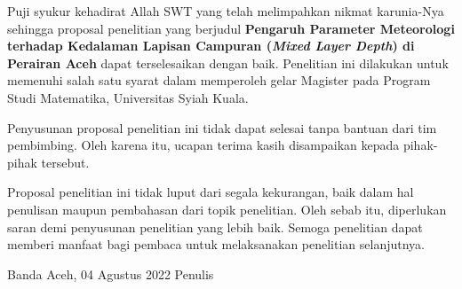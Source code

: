 \begin{spacing}{1.5}
	\pagestyle{empty}
	
	\vskip 1cm
	\par Puji syukur kehadirat Allah SWT yang telah melimpahkan nikmat karunia-Nya sehingga proposal penelitian yang berjudul \textbf{Pengaruh Parameter Meteorologi terhadap Kedalaman Lapisan Campuran (\textit{Mixed Layer Depth}) di Perairan Aceh} dapat terselesaikan dengan baik. Penelitian ini dilakukan untuk memenuhi salah satu syarat dalam memperoleh gelar Magister pada Program Studi Matematika, Universitas Syiah Kuala.
	\par Penyusunan proposal penelitian ini tidak dapat selesai tanpa bantuan dari tim pembimbing. Oleh karena itu, ucapan terima  kasih disampaikan kepada pihak-pihak tersebut.
	\par Proposal penelitian ini tidak luput dari segala kekurangan, baik dalam hal penulisan maupun pembahasan dari topik penelitian. Oleh sebab itu, diperlukan saran demi penyusunan penelitian yang lebih baik. Semoga penelitian dapat memberi manfaat bagi pembaca untuk melaksanakan penelitian selanjutnya.
	\vskip 1cm  
	\begin{flushright}
		Banda Aceh, 04 Agustus 2022
		\vskip 2cm
		Penulis	
	\end{flushright}
\end{spacing}
\pagestyle{empty}